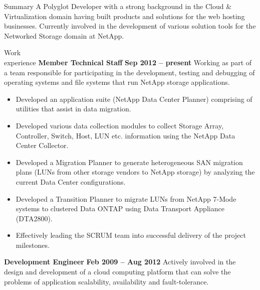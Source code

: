 \documentclass{resume}
\author{Sreejith Kesavan}
\begin{document}
\maketitle

\begin{category}{Summary}
  \citemnobullet A Polyglot Developer with a strong background in the Cloud \& Virtualization 
  domain having built products and solutions for the web hosting businesses. 
  Currently involved in the development of various solution tools for the 
  Networked Storage domain at NetApp.
\end{category}


\begin{category}{Work \\experience}
  \citemnobullet \textbf{Member Technical Staff} \hfill \textbf{Sep 2012 -- present}
  \citemnobullet Working as part of a team responsible for participating in the development, 
  testing and debugging of operating systems and file systems that run NetApp storage applications.
  \begin{itemize}
  \item Developed an application suite (NetApp Data Center Planner) comprising of utilities that 
  assist in data migration.
  \item Developed various data collection modules to collect Storage Array, Controller, Switch, Host, 
  LUN etc. information using the NetApp Data Center Collector.
  \item Developed a Migration Planner to generate heterogeneous SAN migration plans (LUNs from 
  other storage vendors to NetApp storage) by analyzing the current Data Center configurations.
  \item Developed a Transition Planner to migrate LUNs from NetApp 7-Mode systems to clustered
  Data ONTAP using Data Transport Appliance (DTA2800).
  \item Effectively leading the SCRUM team into successful delivery of the project milestones.
  \end{itemize}
  \citemnobullet \textbf{Development Engineer} \hfill \textbf{Feb 2009 -- Aug 2012}
  \citemnobullet Actively involved in the design and development of a cloud computing platform 
  that can solve the problems of application scalability, availability and fault-tolerance.
  \begin{itemize} 

\end{itemize}
\end{category}
\end{document}
